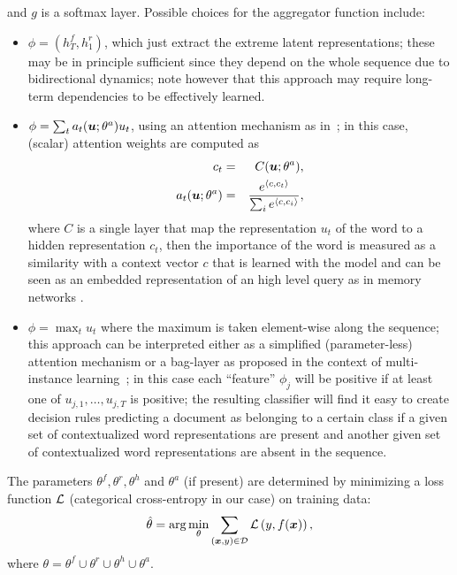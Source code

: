 and $g$ is a softmax layer. Possible choices for the aggregator
function include:
\begin{itemize}
\item $\phi=(h^f_T,h^r_1)$, which just
  extract the extreme latent representations; these may be in
  principle sufficient since they depend on the whole sequence due to
  bidirectional dynamics; note however that this approach may require
  long-term dependencies to be effectively learned.
\item
  $\phi = \sum_t a_t(\bm{u};\theta^a) u_t$,
  using an attention mechanism as in~\cite{yang_hierarchical_2016}; in
  this case, (scalar) attention weights are computed as
  \begin{align*}
    c_t&=&C(\bm{u};\theta^a),\\
    a_t(\bm{u};\theta^a) &=& \frac{e^{\langle c, c_t\rangle}}
    {\sum_i{e^{\langle c, c_i\rangle}}},\\
  \end{align*}
  where $C$ is a single layer that map the representation $u_t$ of the
  word to a hidden representation $c_t$, then the importance of the word is
  measured as a similarity with a context vector $c$ that is learned
  with the model and can be seen as an embedded representation of an
  high level query as in memory networks \cite{sukhbaatar2015end}.
\item $\phi = \max_t u_t$ where the maximum is taken element-wise
  along the sequence; this approach can be interpreted either as a
  simplified (parameter-less) attention mechanism or a bag-layer as
  proposed in the context of multi-instance
  learning~\cite{tibo2017network}; in this case each ``feature''
  $\phi_j$ will be positive if at least one of $u_{j,1},\dots,u_{j,T}$
  is positive; the resulting classifier will find it easy to create
  decision rules predicting a document as belonging to a certain class
  if a given set of contextualized word representations are present
  and another given set of contextualized word representations are
  absent in the sequence.
\end{itemize}

The parameters $\theta^f,\theta^r,\theta^h$ and $\theta^a$ (if
present) are determined by minimizing a loss function $\mathcal{L}$
(categorical cross-entropy in our case) on training data:
\begin{equation}
  \hat \theta = \mathrm{arg}\min_\theta\sum_{(\bm{x},y)\in\mathcal{D}}\mathcal{L}\left(y,f(\bm{x})\right),
\end{equation}
where $\theta=\theta^f\cup\theta^r\cup\theta^h\cup\theta^a$.

